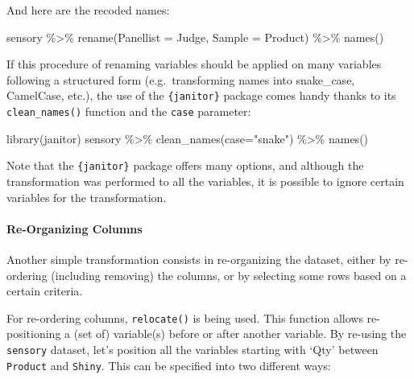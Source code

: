 \documentclass[
]{book}
\newenvironment{Shaded}{\begin{snugshade}}{\end{snugshade}}
\newcommand{\AttributeTok}[1]{\textcolor[rgb]{0.77,0.63,0.00}{#1}}
\newcommand{\FunctionTok}[1]{\textcolor[rgb]{0.00,0.00,0.00}{#1}}
\newcommand{\NormalTok}[1]{#1}
\newcommand{\SpecialCharTok}[1]{\textcolor[rgb]{0.00,0.00,0.00}{#1}}
\newcommand{\StringTok}[1]{\textcolor[rgb]{0.31,0.60,0.02}{#1}}
\begin{document}
And here are the recoded names:

\begin{Shaded}
\begin{Highlighting}[]
\NormalTok{sensory }\SpecialCharTok{\%\textgreater{}\%} 
  \FunctionTok{rename}\NormalTok{(}\AttributeTok{Panellist =}\NormalTok{ Judge, }\AttributeTok{Sample =}\NormalTok{ Product) }\SpecialCharTok{\%\textgreater{}\%} 
  \FunctionTok{names}\NormalTok{()}
\end{Highlighting}
\end{Shaded}

If this procedure of renaming variables should be applied on many variables following a structured form (e.g.~transforming names into snake\_case, CamelCase, etc.), the use of the \texttt{\{janitor\}} package comes handy thanks to its \texttt{clean\_names()} function and the \texttt{case} parameter:

\begin{Shaded}
\begin{Highlighting}[]
\FunctionTok{library}\NormalTok{(janitor)}
\NormalTok{sensory }\SpecialCharTok{\%\textgreater{}\%} 
  \FunctionTok{clean\_names}\NormalTok{(}\AttributeTok{case=}\StringTok{"snake"}\NormalTok{) }\SpecialCharTok{\%\textgreater{}\%} 
  \FunctionTok{names}\NormalTok{()}
\end{Highlighting}
\end{Shaded}

Note that the \texttt{\{janitor\}} package offers many options, and although the transformation was performed to all the variables, it is possible to ignore certain variables for the transformation.

\hypertarget{re-organizing-columns}{%
\paragraph{Re-Organizing Columns}\label{re-organizing-columns}}

Another simple transformation consists in re-organizing the dataset, either by re-ordering (including removing) the columns, or by selecting some rows based on a certain criteria.

For re-ordering columns, \texttt{relocate()} is being used. This function allows re-positioning a (set of) variable(s) before or after another variable. By re-using the \texttt{sensory} dataset, let's position all the variables starting with `Qty' between \texttt{Product} and \texttt{Shiny}. This can be specified into two different ways:
\end{document}
